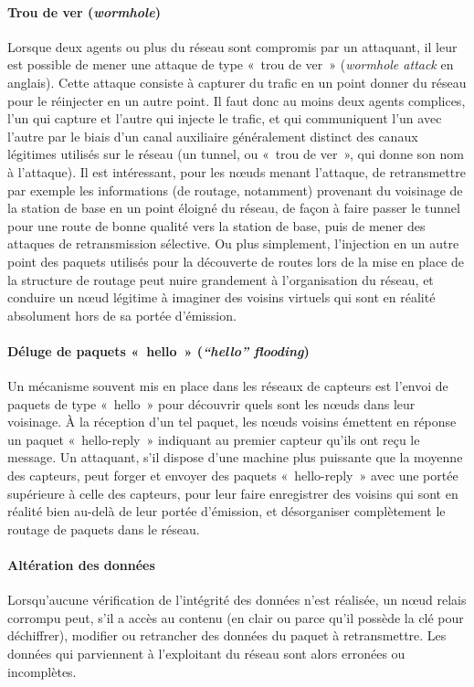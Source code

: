         \paragraph{Trou de ver (\textit{wormhole})}
Lorsque deux agents ou plus du réseau sont compromis par un attaquant, il leur est possible de mener une attaque de type « trou de ver » (\textit{wormhole attack} en anglais).
Cette attaque consiste à capturer du trafic en un point donner du réseau pour le réinjecter en un autre point.
Il faut donc au moins deux agents complices, l'un qui capture et l'autre qui injecte le trafic, et qui communiquent l'un avec l'autre par le biais d'un canal auxiliaire généralement distinct des canaux légitimes utilisés sur le réseau (un tunnel, ou « trou de ver », qui donne son nom à l'attaque).
Il est intéressant, pour les nœuds menant l'attaque, de retransmettre par exemple les informations (de routage, notamment) provenant du voisinage de la station de base en un point éloigné du réseau, de façon à faire passer le tunnel pour une route de bonne qualité vers la station de base, puis de mener des attaques de retransmission sélective.
Ou plus simplement, l'injection en un autre point des paquets utilisés pour la découverte de routes lors de la mise en place de la structure de routage peut nuire grandement à l'organisation du réseau, et conduire un nœud légitime à imaginer des voisins virtuels qui sont en réalité absolument hors de sa portée d'émission.

        \paragraph{Déluge de paquets « hello » (\textit{“hello” flooding})}
Un mécanisme souvent mis en place dans les réseaux de capteurs est l'envoi de paquets de type « hello » pour découvrir quels sont les nœuds dans leur voisinage.
À la réception d'un tel paquet, les nœuds voisins émettent en réponse un paquet « hello-reply » indiquant au premier capteur qu'ils ont reçu le message.
Un attaquant, s'il dispose d'une machine plus puissante que la moyenne des capteurs, peut forger et envoyer des paquets « hello-reply » avec une portée supérieure à celle des capteurs, pour leur faire enregistrer des voisins qui sont en réalité bien au-delà de leur portée d'émission, et désorganiser complètement le routage de paquets dans le réseau.

        \paragraph{Altération des données}
Lorsqu'aucune vérification de l'intégrité des données n'est réalisée, un nœud relais corrompu peut, s'il a accès au contenu (en clair ou parce qu'il possède la clé pour déchiffrer), modifier ou retrancher des données du paquet à retransmettre.
Les données qui parviennent à l'exploitant du réseau sont alors erronées ou incomplètes.

